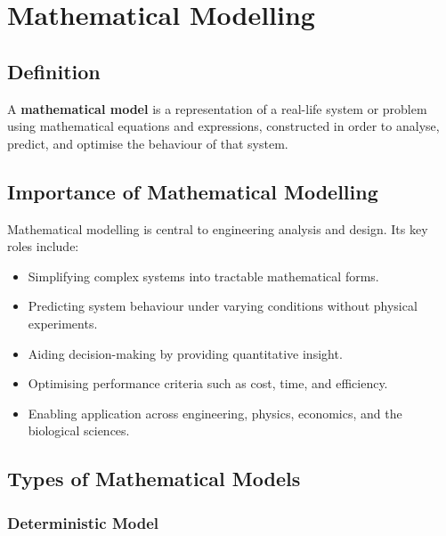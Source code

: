 \chapter{Mathematical Modelling}

\section{Definition}

\begin{definition}
A \textbf{mathematical model} is a representation of a real-life system or problem using mathematical equations and expressions, constructed in order to analyse, predict, and optimise the behaviour of that system.
\end{definition}

\section{Importance of Mathematical Modelling}

Mathematical modelling is central to engineering analysis and design. Its key roles include:

\begin{itemize}
  \item Simplifying complex systems into tractable mathematical forms.
  \item Predicting system behaviour under varying conditions without physical experiments.
  \item Aiding decision-making by providing quantitative insight.
  \item Optimising performance criteria such as cost, time, and efficiency.
  \item Enabling application across engineering, physics, economics, and the biological sciences.
\end{itemize}

\section{Types of Mathematical Models}

\subsection{Deterministic Model}

